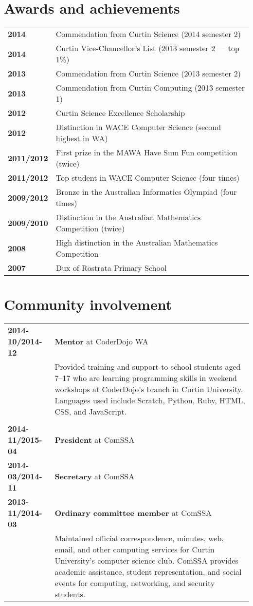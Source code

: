 \documentclass[a4paper,12pt]{article}
\begin{document}
\section*{Awards and achievements}

\begin{tabular}{p{3.5cm}p{12.5cm}}
	\textbf{2014} &
		Commendation from Curtin Science (2014 semester 2)\\
	\textbf{2014} &
		Curtin Vice-Chancellor's List (2013 semester 2 --- top 1\%)\\
	\textbf{2013} &
		Commendation from Curtin Science (2013 semester 2)\\
	\textbf{2013} &
		Commendation from Curtin Computing (2013 semester 1)\\
	\textbf{2012} &
		Curtin Science Excellence Scholarship\\
	\textbf{2012} &
		Distinction in WACE Computer Science (second highest in WA)\\
	\textbf{2011/2012} &
		First prize in the MAWA Have Sum Fun competition (twice)\\
	\textbf{2011/2012} &
		Top student in WACE Computer Science (four times)\\
	\textbf{2009/2012} &
		Bronze in the Australian Informatics Olympiad (four times)\\
	\textbf{2009/2010} &
		Distinction in the Australian Mathematics Competition (twice)\\
	\textbf{2008} &
		High distinction in the Australian Mathematics Competition\\
	\textbf{2007} &
		Dux of Rostrata Primary School
\end{tabular}

\section*{Community involvement}

\begin{tabular}{p{3.5cm}p{12.5cm}}
	\textbf{2014-10/2014-12} &
		\textbf{Mentor} at CoderDojo WA\\ &
		Provided training and support to school students aged 7--17
		who are learning programming skills in weekend workshops at
		CoderDojo's branch in Curtin University. Languages used include
		Scratch, Python, Ruby, HTML, CSS, and JavaScript.\\\\
	\textbf{2014-11/2015-04} &
		\textbf{President} at ComSSA\\
	\textbf{2014-03/2014-11} &
		\textbf{Secretary} at ComSSA\\
	\textbf{2013-11/2014-03} &
		\textbf{Ordinary committee member} at ComSSA\\ &
		Maintained official correspondence, minutes, web, email, and
		other computing services for Curtin University's computer
		science club. ComSSA provides academic assistance, student
		representation, and social events for computing, networking,
		and security students.
\end{tabular}
\end{document}
